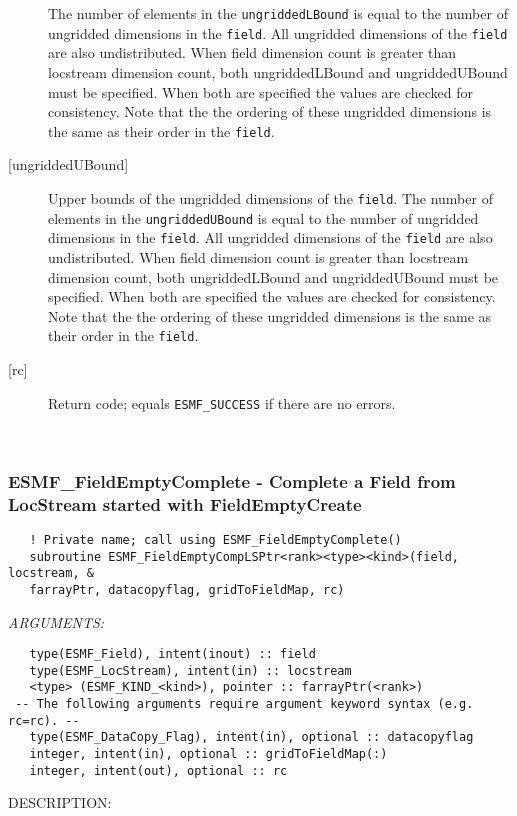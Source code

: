 \begin{description}
   The number of elements in the {\tt ungriddedLBound} is equal to the number of ungridded 
   dimensions in the {\tt field}. All ungridded dimensions of the 
   {\tt field} are also undistributed. When field dimension count is 
   greater than locstream dimension count, both ungriddedLBound and ungriddedUBound 
   must be specified. When both are specified the values are checked 
   for consistency. Note that the the ordering of 
   these ungridded dimensions is the same as their order in the {\tt field}. 
   \item [{[ungriddedUBound]}] 
   Upper bounds of the ungridded dimensions of the {\tt field}. 
   The number of elements in the {\tt ungriddedUBound} is equal to the number of ungridded 
   dimensions in the {\tt field}. All ungridded dimensions of the 
   {\tt field} are also undistributed. When field dimension count is 
   greater than locstream dimension count, both ungriddedLBound and ungriddedUBound 
   must be specified. When both are specified the values are checked 
   for consistency. Note that the the ordering of 
   these ungridded dimensions is the same as their order in the {\tt field}. 
   \item [{[rc]}] 
   Return code; equals {\tt ESMF\_SUCCESS} if there are no errors. 
   \end{description} 
    
 
\mbox{}\hrulefill\ 
 
\subsubsection [ESMF\_FieldEmptyComplete] {ESMF\_FieldEmptyComplete - Complete a Field from LocStream started with FieldEmptyCreate }


   
\begin{verbatim}   ! Private name; call using ESMF_FieldEmptyComplete() 
   subroutine ESMF_FieldEmptyCompLSPtr<rank><type><kind>(field, locstream, & 
   farrayPtr, datacopyflag, gridToFieldMap, rc) 
   \end{verbatim}{\em ARGUMENTS:}
\begin{verbatim}   type(ESMF_Field), intent(inout) :: field 
   type(ESMF_LocStream), intent(in) :: locstream 
   <type> (ESMF_KIND_<kind>), pointer :: farrayPtr(<rank>) 
 -- The following arguments require argument keyword syntax (e.g. rc=rc). --
   type(ESMF_DataCopy_Flag), intent(in), optional :: datacopyflag 
   integer, intent(in), optional :: gridToFieldMap(:) 
   integer, intent(out), optional :: rc 
   \end{verbatim}
{\sf DESCRIPTION:\\ }

